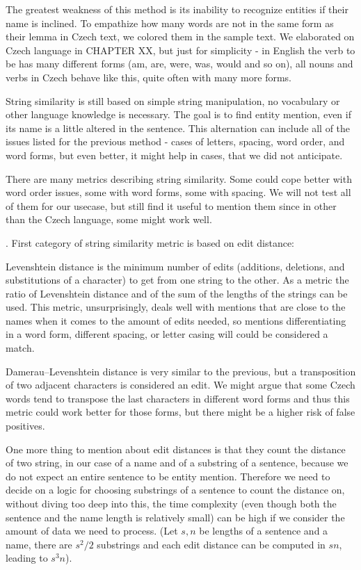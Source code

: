 The greatest weakness of this method is its inability to recognize entities if their name is inclined. To empathize how many words are not in the same form as their lemma in Czech text, we colored them in the sample text.  We elaborated on Czech language in  CHAPTER XX, but just for simplicity - in English the verb to be has many different forms (am, are, were, was, would and so on), all nouns and verbs in Czech behave like this, quite often with many more forms.

 String similarity is still based on simple string manipulation, no vocabulary or other language knowledge is necessary. The goal is to find entity mention, even if its name is a little altered in the sentence. This alternation can include all of the issues listed for the previous method - cases of letters, spacing, word order, and word forms, but even better, it might help in cases, that we did not anticipate.

There are many metrics describing string similarity. Some could cope better with word order issues, some with word forms, some with spacing. We will not test all of them for our usecase, but still find it useful to mention them since in other than the Czech language, some might work well.

. First category of string similarity metric is based on edit distance:

Levenshtein distance is the minimum number of edits (additions, deletions, and substitutions of a character) to get from one string to the other. As a metric the ratio of Levenshtein distance and of the sum of the lengths of the strings can be used. This metric, unsurprisingly, deals well with mentions that are close to the names when it comes to the amount of edits needed, so mentions differentiating in a word form, different spacing, or letter casing will could be considered a match.

Damerau–Levenshtein distance is very similar to the previous, but a transposition of two adjacent characters is considered an edit. We might argue that some Czech words tend to transpose the last characters in different word forms and thus this metric could work better for those forms, but there might be a higher risk of false positives.

One more thing to mention about edit distances is that they count the distance of two string, in our case of a name and of a substring of a sentence, because we do not expect an entire sentence to be entity mention. Therefore we need to decide on a logic for choosing substrings of a sentence to count the distance on, without diving too deep into this, the time complexity (even though both the sentence and the name length is relatively small) can be high if we consider the amount of data we need to process. (Let $s, n$ be lengths of a sentence and a name, there are $s^2/2$ substrings and each edit distance can be computed in $sn$, leading to $s^3n$). 

